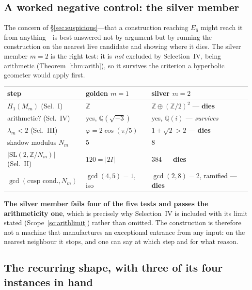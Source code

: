 \documentclass[11pt,reqno]{amsart}
\theoremstyle{plain}
\theoremstyle{definition}
\theoremstyle{remark}
\newcommand{\Q}{\mathbb{Q}}
\newcommand{\Z}{\mathbb{Z}}
\newcommand{\SL}{\mathrm{SL}}
\begin{document}
\subsection{A worked negative control: the silver member}\label{sec:silver}

The concern of \S\ref{sec:suspicious}---that a construction reaching $E_6$ might reach it
from anything---is best answered not by argument but by running the construction on the
nearest live candidate and showing where it dies. The silver member $m=2$ is the right
test: it is \emph{not} excluded by Selection~IV, being arithmetic
(Theorem~\ref{thm:arith}), so it survives the criterion a hyperbolic geometer would apply
first.

\begin{table}[htbp]
\centering\small
\begin{tabular}{@{}p{}p{}p{}@{}}
\toprule
step & golden $m=1$ & silver $m=2$\\
\midrule
$H_1(M_m)$ (Sel.~I) & $\Z$ & $\Z\oplus(\Z/2)^2$ --- \textbf{dies}\\
arithmetic? (Sel.~IV) & yes, $\Q(\sqrt{-3})$ & yes, $\Q(i)$ --- \emph{survives}\\
$\lambda_m<2$ (Sel.~III) & $\varphi=2\cos(\pi/5)$ & $1+\sqrt2>2$ --- \textbf{dies}\\
shadow modulus $N_m$ & $5$ & $8$\\
$|\SL(2,\Z/N_m)|$ (Sel.~II) & $120=|2I|$ & $384$ --- \textbf{dies}\\
$\gcd(\text{cusp cond.},N_m)$ & $\gcd(4,5)=1$, iso & $\gcd(2,8)=2$, ramified --- \textbf{dies}\\
\bottomrule
\end{tabular}
\end{table}

\textbf{The silver member fails four of the five tests and passes the arithmeticity
one}, which is precisely why Selection~IV is included with its limit stated
(Scope~\ref{sc:arithlimit}) rather than omitted. The construction is therefore not a
machine that manufactures an exceptional entrance from any input: on the nearest
neighbour it stops, and one can say at which step and for what reason.

\subsection{The recurring shape, with three of its four instances in hand}%
\label{sec:shape}
\end{document}
